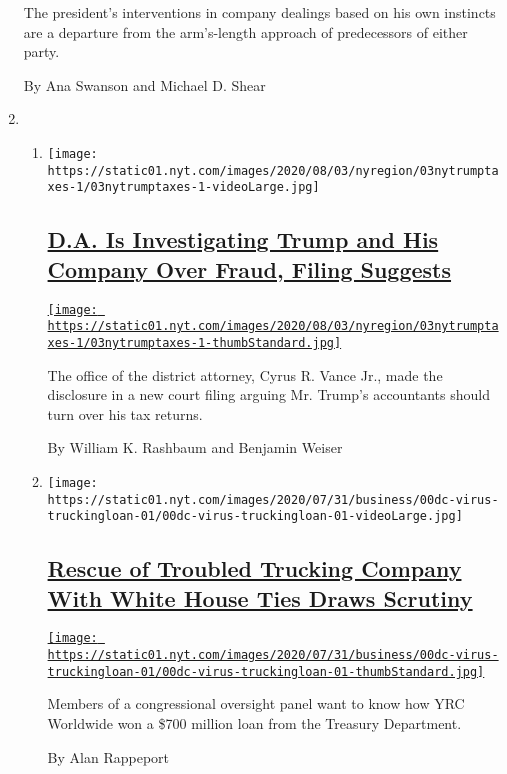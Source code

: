 \begin{enumerate}
  The president's interventions in company dealings based on his own
  instincts are a departure from the arm's-length approach of
  predecessors of either party.

  By Ana Swanson and Michael D. Shear
\item
  \begin{enumerate}
  \def\labelenumii{\arabic{enumii}.}
  \item
    \texttt{[image: https://static01.nyt.com/images/2020/08/03/nyregion/03nytrumptaxes-1/03nytrumptaxes-1-videoLarge.jpg]}

    \hypertarget{da-is-investigating-trump-and-his-company-over-fraud-filing-suggests}{%
    \subsection{\texorpdfstring{\href{/2020/08/03/nyregion/donald-trump-taxes-cyrus-vance.html}{D.A.
    Is Investigating Trump and His Company Over Fraud, Filing
    Suggests}}{D.A. Is Investigating Trump and His Company Over Fraud, Filing Suggests}}\label{da-is-investigating-trump-and-his-company-over-fraud-filing-suggests}}

    \href{/2020/08/03/nyregion/donald-trump-taxes-cyrus-vance.html}{\texttt{[image: https://static01.nyt.com/images/2020/08/03/nyregion/03nytrumptaxes-1/03nytrumptaxes-1-thumbStandard.jpg]}}

    The office of the district attorney, Cyrus R. Vance Jr., made the
    disclosure in a new court filing arguing Mr. Trump's accountants
    should turn over his tax returns.

    By William K. Rashbaum and Benjamin Weiser
  \item
    \texttt{[image: https://static01.nyt.com/images/2020/07/31/business/00dc-virus-truckingloan-01/00dc-virus-truckingloan-01-videoLarge.jpg]}

    \hypertarget{rescue-of-troubled-trucking-company-with-white-house-ties-draws-scrutiny}{%
    \subsection{\texorpdfstring{\href{/2020/08/03/us/politics/yrc-coronavirus-relief-funds.html}{Rescue
    of Troubled Trucking Company With White House Ties Draws
    Scrutiny}}{Rescue of Troubled Trucking Company With White House Ties Draws Scrutiny}}\label{rescue-of-troubled-trucking-company-with-white-house-ties-draws-scrutiny}}

    \href{/2020/08/03/us/politics/yrc-coronavirus-relief-funds.html}{\texttt{[image: https://static01.nyt.com/images/2020/07/31/business/00dc-virus-truckingloan-01/00dc-virus-truckingloan-01-thumbStandard.jpg]}}

    Members of a congressional oversight panel want to know how YRC
    Worldwide won a \$700 million loan from the Treasury Department.

    By Alan Rappeport
  \end{enumerate}
\end{enumerate}

